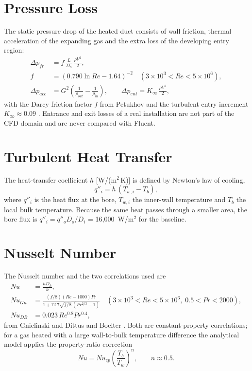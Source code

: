 \section{Pressure Loss}
The static pressure drop of the heated duct consists of wall friction, thermal acceleration of the expanding gas and the extra loss of the
developing entry region:
\begin{align}
\Delta p_{fr} &= f\,\frac{L}{D_h}\,\frac{\rho V^2}{2}, \label{eq:darcy}\\
f &= \left(0.790\ln Re - 1.64\right)^{-2} \quad (3\times10^3 < Re < 5\times10^6), \label{eq:petukhov}\\
\Delta p_{acc} &= G^2\left(\frac{1}{\rho_{out}} - \frac{1}{\rho_{in}}\right), \qquad \Delta p_{ent} = K_\infty\,\frac{\rho V^2}{2}, \label{eq:acc}
\end{align}
with the Darcy friction factor $f$ from Petukhov \cite{petukhov1970} and the turbulent entry increment $K_\infty \approx 0.09$
\cite{kayslondon}. Entrance and exit losses of a real installation are not part of the CFD domain and are never compared with Fluent.

\section{Turbulent Heat Transfer}
The heat-transfer coefficient $h$ [W/(m$^2$\,K)] is defined by Newton's law of cooling,
\begin{equation}
q''_i = h\,(T_{w,i} - T_b),
\label{eq:newton}
\end{equation}
where $q''_i$ is the heat flux at the bore, $T_{w,i}$ the inner-wall temperature and $T_b$ the local bulk temperature. Because the same
heat passes through a smaller area, the bore flux is $q''_i = q''_o D_o/D_i$ = 16,000~W/m$^2$ for the baseline.

\section{Nusselt Number}
The Nusselt number and the two correlations used are
\begin{align}
Nu &= \frac{h D_h}{k}, \label{eq:nu}\\
Nu_{Gn} &= \frac{(f/8)(Re-1000)Pr}{1 + 12.7\sqrt{f/8}\,\left(Pr^{2/3}-1\right)} \quad (3\times10^3 < Re < 5\times10^6,\; 0.5 < Pr < 2000), \label{eq:gnielinski}\\
Nu_{DB} &= 0.023\,Re^{0.8}Pr^{0.4}, \label{eq:db}
\end{align}
from Gnielinski \cite{gnielinski1976} and Dittus and Boelter \cite{dittus1930}. Both are constant-property correlations; for a gas heated
with a large wall-to-bulk temperature difference the analytical model applies the property-ratio correction \cite{kayscrawford}
\begin{equation}
Nu = Nu_{cp}\left(\frac{T_b}{T_w}\right)^{n}, \qquad n \approx 0.5 .
\label{eq:propcorr}
\end{equation}


